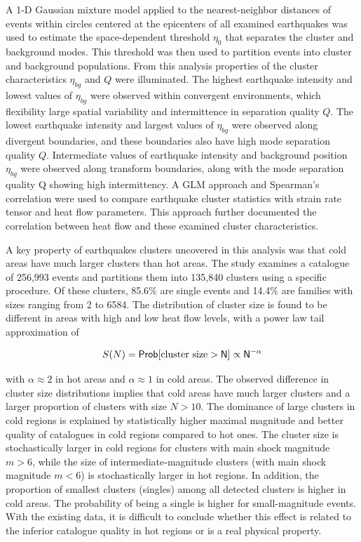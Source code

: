 \documentclass[12pt]{article} %
\theoremstyle{plain}
\begin{document}
	A 1-D Gaussian mixture model applied to the nearest-neighbor distances of events within circles centered at the epicenters of all examined earthquakes was used to estimate the space-dependent threshold $\eta_0$ that separates the cluster and background modes. This threshold was then used to partition events into cluster and background populations. From this analysis properties of the cluster characteristics $\eta_{bg}$ and $Q$ were illuminated. The highest earthquake intensity and lowest values of $\eta_{bg}$ were observed within convergent environments, which flexibility large spatial variability and intermittence in separation quality $Q$. The lowest earthquake intensity and largest values of $\eta_{bg}$ were observed along divergent boundaries, and these boundaries also have high mode separation quality $Q$. Intermediate values of earthquake intensity and background position $\eta_{bg}$ were observed along transform boundaries, along with the mode separation quality Q showing high intermittency. A GLM approach and Spearman's correlation were used to compare earthquake cluster statistics with strain rate tensor and heat flow parameters. This approach further documented the correlation between heat flow and these examined cluster characteristics. 
	
	A key property of earthquakes clusters uncovered in this analysis was that cold areas have much larger clusters than hot areas. The study examines a catalogue of 256,993 events and partitions them into 135,840 clusters using a specific procedure. Of these clusters, 85.6$\%$ are single events and 14.4$\%$ are families with sizes ranging from 2 to 6584. The distribution of cluster size is found to be different in areas with high and low heat flow levels, with a power law tail approximation of 
	
	\begin{equation}
		S(N) = \sf Prob[\text{cluster size} > N] 	\propto N^{-\alpha} 
	\end{equation}
	
	
	\noindent with $\alpha \approx 2$ in hot areas and $\alpha \approx 1$ in cold areas. The observed difference in cluster size distributions implies that cold areas have much larger clusters and a larger proportion of clusters with size $N>10$. The dominance of large clusters in cold regions is explained by statistically higher maximal magnitude and better quality of catalogues in cold regions compared to hot ones. The cluster size is stochastically larger in cold regions for clusters with main shock magnitude $m>6$, while the size of intermediate-magnitude clusters (with main shock magnitude $m<6$) is stochastically larger in hot regions. In addition, the proportion of smallest clusters (singles) among all detected clusters is higher in cold areas. The probability of being a single is higher for small-magnitude events. With the existing data, it is difficult to conclude whether this effect is related to the inferior catalogue quality in hot regions or is a real physical property.
	
\end{document}
